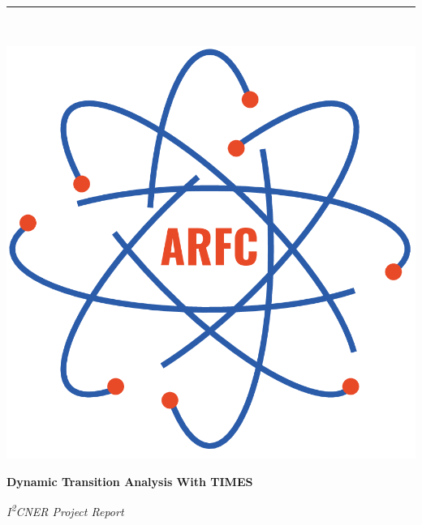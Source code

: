 \documentclass[14pt,a4paper]{article} %
\begin{document}
\sloppy


\begin{titlepage} %
    \newcommand{\HRule}{\rule{\linewidth}{0.5mm}} %
    
    \center %

    
    \HRule\\[0.2cm]
    
     \begin{minipage}{0.4\textwidth}
        \includegraphics[width=\textwidth]{arfc-logo}
        \end{minipage}%
        \begin{minipage}{0.6\textwidth}
        {\begin{flushright}\huge\bfseries Dynamic Transition Analysis With TIMES\end{flushright}}
        {\begin{flushright}\large\textit{I\textsuperscript{2}CNER Project Report}\end{flushright}}


\end{minipage}
\end{titlepage}
\end{document}
